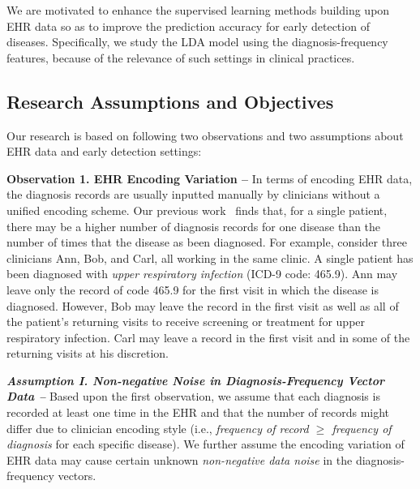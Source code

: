 We are motivated to enhance the supervised learning methods building upon EHR data so as to improve the prediction accuracy for early detection of diseases.
Specifically, we study the LDA model using the diagnosis-frequency features, because of the relevance of such settings in clinical practices.
 

\subsection{Research Assumptions and Objectives}

Our research is based on following two  observations and two assumptions about EHR data and early detection settings:

\textbf{Observation 1.  EHR Encoding Variation -- }  In terms of encoding EHR data, the diagnosis records are usually inputted manually by clinicians without a unified encoding scheme.
Our previous work~\cite{alicia2015evaluating} finds that, for a single patient, there may be a higher number of diagnosis records for one disease than the number of times that the disease as been diagnosed.
For example, consider three clinicians  Ann,  Bob, and Carl, all working in the same  clinic.
A single patient has been  diagnosed with \emph{upper respiratory infection} (ICD-9 code:  465.9).
Ann may leave only the record of code 465.9 for the first visit  in which the disease is diagnosed.
However,  Bob may leave the  record in the first visit as well as all of the patient's  returning visits to receive  screening or treatment  for  upper respiratory infection.
Carl may leave a record in the first visit and in some of the returning visits at his discretion.



\textbf{\em Assumption I.  Non-negative Noise in Diagnosis-Frequency Vector Data -- } Based upon the first observation, we assume that each diagnosis is recorded at least one time in the EHR and that the number of records might differ due to clinician encoding style (i.e., \emph{frequency of record $\geq$ frequency of diagnosis} for each specific disease).
We further assume the encoding variation of EHR data may cause certain unknown \emph{non-negative data noise} in the diagnosis-frequency vectors.
 

